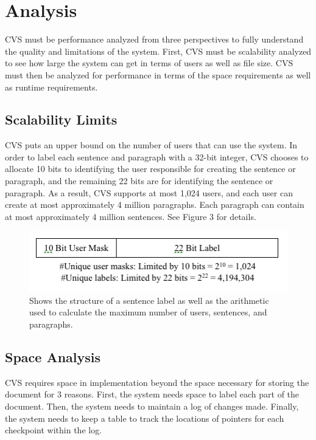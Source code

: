 \section{Analysis}

CVS must be performance analyzed from three perspectives to fully understand the quality and limitations of the system.  First, CVS must be scalability analyzed to see how large the system can get in terms of users as well as file size.  CVS must then be analyzed for performance in terms of the space requirements as well as runtime requirements.

\subsection{Scalability Limits}

CVS puts an upper bound on the number of users that can use the system.  In order to label each sentence and paragraph with a 32-bit integer, CVS chooses to allocate 10 bits to identifying the user responsible for creating the sentence or paragraph, and the remaining 22 bits are for identifying the sentence or paragraph.  As a result, CVS supports at most 1,024 users, and each user can create at most approximately 4 million paragraphs.  Each paragraph can contain at most approximately 4 million sentences.  See Figure 3 for details.

\begin{figure}
\begin{center}
\includegraphics[scale=0.55]{analysis_figure_1.png}
\end{center}
\caption{Shows the structure of a sentence label as well as the arithmetic used to calculate the maximum number of users, sentences, and paragraphs.}
\end{figure}

\subsection{Space Analysis}

CVS requires space in implementation beyond the space necessary for storing the document for 3 reasons.  First, the system needs space to label each part of the document.  Then, the system needs to maintain a log of changes made.  Finally, the system needs to keep a table to track the locations of pointers for each checkpoint within the log.

